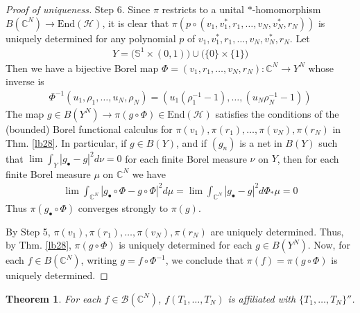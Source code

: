\documentclass[12pt,b5paper,notitlepage]{article}
\theoremstyle{definition}
\theoremstyle{plain}
\newtheorem{thm}[df]{Theorem}
\newcommand{\mc}{\mathcal}
\newcommand{\End}{\mathrm{End}} %
\newcommand{\scr}{\mathscr}
\newcommand{\mbb}{\mathbb}
\newcommand{\blt}{\bullet}
\newcommand{\Cbb}{\mathbb C}
\numberwithin{equation}{section}
\begin{document}
\begin{proof}[Proof of uniqueness]
Step 6. Since $\pi$ restricts to a unital $*$-homomorphism $B(\Cbb^N)\rightarrow\End(\mc H)$, it is clear that $\pi(p\circ(v_1,v_1^*,r_1,\dots,v_N,v_N^*,r_N))$ is uniquely determined for any polynomial $p$ of $v_1,v_1^*,r_1,\dots,v_N,v_N^*,r_N$. Let
\begin{align*}
Y=\big(\mbb S^1\times (0,1)\big)\cup \big(\{0\}\times \{1\}\big)
\end{align*}
Then we have a bijective Borel map $\Phi=(v_1,r_1,\dots,v_N,r_N):\Cbb^N\rightarrow Y^N$ whose inverse is
\begin{align*}
\Phi^{-1}(u_1,\rho_1,\dots,u_N,\rho_N)=(u_1(\rho_1^{-1}-1),\dots,(u_N\rho_N^{-1}-1))
\end{align*}
The map $g\in B(Y^N)\rightarrow \pi(g\circ\Phi)\in\End(\mc H)$ satisfies the conditions of the (bounded) Borel functional calculus for $\pi(v_1),\pi(r_1),\dots,\pi(v_N),\pi(r_N)$ in Thm. \ref{lb28}. In particular, if $g\in B(Y)$, and if $(g_n)$ is a net in $B(Y)$ such that $\lim\int_Y |g_\blt-g|^2d\nu=0$ for each finite Borel measure $\nu$ on $Y$, then for each finite Borel measure $\mu$ on $\Cbb^N$ we have
\begin{align*}
\lim \int_{\Cbb^N}|g_\blt\circ\Phi-g\circ\Phi|^2d\mu=\lim \int_{\Cbb^N}|g_\blt-g|^2d\Phi_*\mu=0
\end{align*}
Thus $\pi(g_\blt\circ\Phi)$ converges strongly to $\pi(g)$.

By Step 5, $\pi(v_1),\pi(r_1),\dots,\pi(v_N),\pi(r_N)$ are uniquely determined. Thus, by Thm. \ref{lb28}, $\pi(g\circ\Phi)$ is uniquely determined for each $g\in B(Y^N)$. Now, for each $f\in B(\Cbb^N)$, writing $g=f\circ\Phi^{-1}$, we conclude that $\pi(f)=\pi(g\circ\Phi)$ is uniquely determined.
\end{proof}


\begin{thm}\label{lb50}
For each $f\in\scr B(\Cbb^N)$, $f(T_1,\dots,T_N)$ is affiliated with $\{T_1,\dots,T_N\}''$.
\end{thm}
\end{document}

